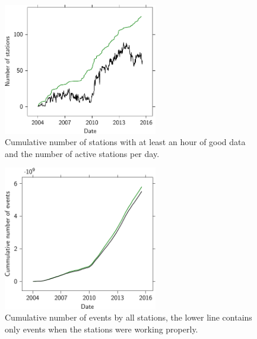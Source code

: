 \begin{figure}
    \centering
    \includegraphics[width=0.6\textwidth]
                    {plots/experiment/active_stations}
    \caption{Cumulative number of stations with at least an hour of good data and the number of active stations per day.}
    \label{fig:active_stations}
\end{figure}

\begin{figure}
    \centering
    \includegraphics[width=0.6\textwidth]
                    {plots/experiment/luminosity_network}
    \caption{Cumulative number of events by all stations, the lower line contains only events when the stations were working properly.}
    \label{fig:luminosity_network}
\end{figure}

